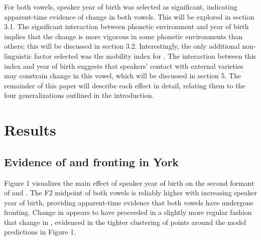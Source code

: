 \documentclass[12pt]{article}
\begin{document}
For both vowels, speaker year of birth was selected as significant, indicating apparent-time evidence of change in both vowels. This will be explored in section 3.1. The significant interaction between phonetic environment and year of birth implies that the change is more vigorous in some phonetic environments than others; this will be discussed in section 3.2. Interestingly, the only additional non-linguistic factor selected was the mobility index for . The interaction between this index and year of birth suggests that speakers' contact with external varieties may constrain change in this vowel, which will be discussed in section 5. The remainder of this paper will describe each effect in detail, relating them to the four generalizations outlined in the introduction.

\section{Results}
\subsection{Evidence of  and  fronting in York}
Figure 1 visualizes the main effect of speaker year of birth on the second formant of  and . The F2 midpoint of both vowels is reliably higher with increasing speaker year of birth, providing apparent-time evidence that both vowels have undergone fronting. Change in  appears to have proceeded in a slightly more regular fashion that change in , evidenced in the tighter clustering of points around the model predictions in Figure 1. 
\end{document}
